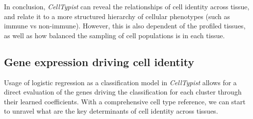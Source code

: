 In conclusion, \textit{CellTypist} can reveal the relationships of cell identity across tissue, and relate it to a more structured hierarchy of cellular phenotypes (such as immune vs non-immune). However, this is also dependent of the profiled tissues, as well as how balanced the sampling of cell populations is in each tissue.


\subsection{Gene expression driving cell identity}
\label{section_genes}
Usage of logistic regression as a classification model in \textit{CellTypist} allows for a direct evaluation of the genes driving the classification for each cluster through their learned coefficients. With a comprehensive cell type reference, we can start to unravel what are the key determinants of cell identity across tissues.

